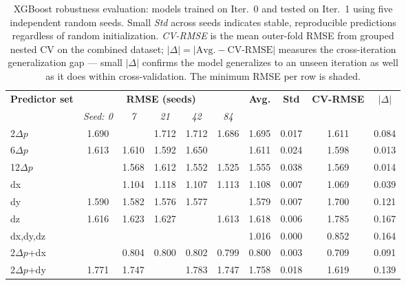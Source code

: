         \begin{table}[htbp]
        \centering
        \captionsetup{font=footnotesize}
        \caption{XGBoost robustness evaluation: models trained on Iter.~0 and tested on Iter.~1 using five independent random seeds. Small \textit{Std} across seeds indicates stable, reproducible predictions regardless of random initialization. \textit{CV-RMSE} is the mean outer-fold RMSE from grouped nested CV on the combined dataset; $|\Delta| = |\text{Avg.} - \text{CV-RMSE}|$ measures the cross-iteration generalization gap --- small $|\Delta|$ confirms the model generalizes to an unseen iteration as well as it does within cross-validation. The minimum RMSE per row is shaded.}
        \footnotesize
        \setlength{\tabcolsep}{5pt}
        \renewcommand{\arraystretch}{1.2}
        \begin{tabular}{l|ccccc|cc|cc}
        \hline\hline
        \textbf{Predictor set} & \multicolumn{5}{c|}{\textbf{RMSE (seeds)}} & \textbf{Avg.} & \textbf{Std} & \textbf{CV-RMSE} & \textbf{$|\Delta|$} \\
         & \textit{Seed: 0} & \textit{7} & \textit{21} & \textit{42} & \textit{84} & & & & \\
        \hline
        2$\Delta p$ & 1.690 & \cellcolor{gray!20}{1.674} & 1.712 & 1.712 & 1.686 & 1.695 & 0.017 & 1.611 & 0.084 \\
        6$\Delta p$ & 1.613 & 1.610 & 1.592 & 1.650 & \cellcolor{gray!20}{1.591} & 1.611 & 0.024 & 1.598 & 0.013 \\
        12$\Delta p$ & \cellcolor{gray!20}{1.518} & 1.568 & 1.612 & 1.552 & 1.525 & 1.555 & 0.038 & 1.569 & 0.014 \\
        dx & \cellcolor{gray!20}{1.100} & 1.104 & 1.118 & 1.107 & 1.113 & 1.108 & 0.007 & 1.069 & 0.039 \\
        dy & 1.590 & 1.582 & 1.576 & 1.577 & \cellcolor{gray!20}{1.571} & 1.579 & 0.007 & 1.700 & 0.121 \\
        dz & 1.616 & 1.623 & 1.627 & \cellcolor{gray!20}{1.613} & 1.613 & 1.618 & 0.006 & 1.785 & 0.167 \\
        dx,dy,dz & \cellcolor{gray!20}{1.016} & \cellcolor{gray!20}{1.016} & \cellcolor{gray!20}{1.016} & \cellcolor{gray!20}{1.016} & \cellcolor{gray!20}{1.016} & 1.016 & 0.000 & 0.852 & 0.164 \\
        2$\Delta p$+dx & \cellcolor{gray!20}{0.796} & 0.804 & 0.800 & 0.802 & 0.799 & 0.800 & 0.003 & 0.709 & 0.091 \\
        2$\Delta p$+dy & 1.771 & 1.747 & \cellcolor{gray!20}{1.743} & 1.783 & 1.747 & 1.758 & 0.018 & 1.619 & 0.139 \\

\end{tabular}
\end{table}
